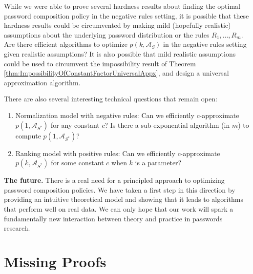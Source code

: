 \documentclass[prodmode,acmec]{ec-acmsmall}
\newenvironment{remindertheorem}[1]{\medskip \noindent {\bf Reminder of Theorem #1.  }\em}{}
\begin{document}
\smallskip
{} 
While we were able to prove several hardness results about finding the optimal password composition policy in the negative rules setting, it is possible that these hardness results could be circumvented by making mild (hopefully realistic) assumptions about the underlying password distribution or the rules $R_1,...,R_m$. Are there efficient algorithms to optimize $p\left(k,\mathcal{A}_S\right)$ in the negative rules setting given realistic assumptions? It is also possible that mild realistic assumptions could be used to circumvent the impossibility result of Theorem \ref{thm:ImpossibilityOfConstantFactorUniversalAppx}, and design a universal approximation algorithm. 

There are also several interesting technical questions that remain open: 
\begin{enumerate}
\item Normalization model with negative rules: Can we efficiently $c$-approximate $p\left(1,\mathcal{A}_{S^*}\right)$ for any constant $c$? Is there a sub-exponential algorithm (in $m$) to compute $p\left(1,\mathcal{A}_{S^*}\right)$? 
\item Ranking model with positive rules: Can we efficiently $c$-approximate $p\left(k,\mathcal{A}_{S^*}\right)$ for some constant $c$ when $k$
is a parameter?
\end{enumerate}

\smallskip
\noindent\textbf{The future.} There is a real need for a principled approach to optimizing password composition policies. We have taken a first step in this direction by providing an intuitive theoretical model and showing that it leads to algorithms that perform well on real data. We can only hope that our work will spark a fundamentally new interaction between theory and practice in passwords research.




\newpage


\appendix
\section{Missing Proofs}

\begin{remindertheorem}{ \ref{thm:UGCHardness}}
\thmUGCHardness
\end{remindertheorem}

\medskip
\end{document}

